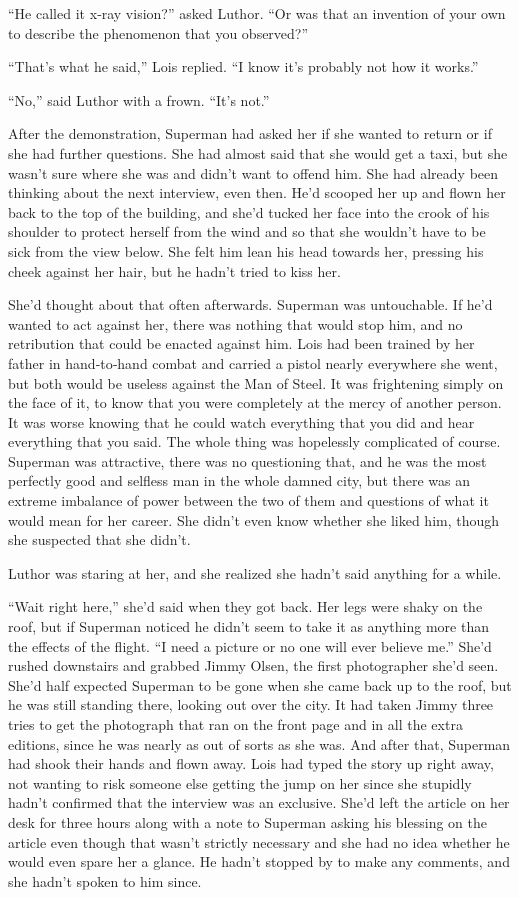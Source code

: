 ``He called it x‐ray vision?'' asked Luthor. ``Or was that an invention
of your own to describe the phenomenon that you observed?''

``That's what he said,'' Lois replied. ``I know it's probably not how it
works.''

``No,'' said Luthor with a frown. ``It's not.''

After the demonstration, Superman had asked her if she wanted to return
or if she had further questions. She had almost said that she would get
a taxi, but she wasn't sure where she was and didn't want to offend him.
She had already been thinking about the next interview, even then. He'd
scooped her up and flown her back to the top of the building, and she'd
tucked her face into the crook of his shoulder to protect herself from
the wind and so that she wouldn't have to be sick from the view below.
She felt him lean his head towards her, pressing his cheek against her
hair, but he hadn't tried to kiss her.

She'd thought about that often afterwards. Superman was untouchable. If
he'd wanted to act against her, there was nothing that would stop him,
and no retribution that could be enacted against him. Lois had been
trained by her father in hand‐to‐hand combat and carried a pistol nearly
everywhere she went, but both would be useless against the Man of Steel.
It was frightening simply on the face of it, to know that you were
completely at the mercy of another person. It was worse knowing that he
could watch everything that you did and hear everything that you said.
The whole thing was hopelessly complicated of course. Superman was
attractive, there was no questioning that, and he was the most perfectly
good and selfless man in the whole damned city, but there was an extreme
imbalance of power between the two of them and questions of what it
would mean for her career. She didn't even know whether she liked him,
though she suspected that she didn't.

Luthor was staring at her, and she realized she hadn't said anything for
a while.

``Wait right here,'' she'd said when they got back. Her legs were shaky
on the roof, but if Superman noticed he didn't seem to take it as
anything more than the effects of the flight. ``I need a picture or no
one will ever believe me.'' She'd rushed downstairs and grabbed Jimmy
Olsen, the first photographer she'd seen. She'd half expected Superman
to be gone when she came back up to the roof, but he was still standing
there, looking out over the city. It had taken Jimmy three tries to get
the photograph that ran on the front page and in all the extra editions,
since he was nearly as out of sorts as she was. And after that, Superman
had shook their hands and flown away. Lois had typed the story up right
away, not wanting to risk someone else getting the jump on her since she
stupidly hadn't confirmed that the interview was an exclusive. She'd
left the article on her desk for three hours along with a note to
Superman asking his blessing on the article even though that wasn't
strictly necessary and she had no idea whether he would even spare her a
glance. He hadn't stopped by to make any comments, and she hadn't spoken
to him since.

